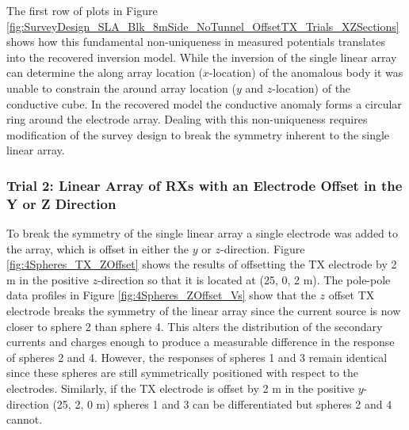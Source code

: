 \documentclass[preprint,authoryear,12pt]{elsarticle}
\begin{document}
The first row of plots in Figure \ref{fig:SurveyDesign_SLA_Blk_8mSide_NoTunnel_OffsetTX_Trials_XZSections} shows how this fundamental non-uniqueness in measured potentials translates into the recovered inversion model. While the inversion of the single linear array can determine the along array location ($x$-location) of the anomalous body it was unable to constrain the around array location ($y$ and $z$-location) of the conductive cube. In the recovered model the conductive anomaly forms a circular ring around the electrode array. Dealing with this non-uniqueness requires modification of the survey design to break the symmetry inherent to the single linear array.


\subsubsection{Trial 2: Linear Array of RXs with an Electrode Offset in the Y or Z Direction}
\label{sec:TheoreticalAnalysis_Trial2_SingleElecOffset}

To break the symmetry of the single linear array a single electrode was added to the array, which is offset in either the $y$ or $z$-direction. Figure \ref{fig:4Spheres_TX_ZOffset} shows the results of offsetting the TX electrode by 2 m in the positive $z$-direction so that it is located at (25, 0, 2 m). The pole-pole data profiles in Figure \ref{fig:4Spheres_ZOffset_Vs} show that the $z$ offset TX electrode breaks the symmetry of the linear array since the current source is now closer to sphere 2 than sphere 4. This alters the distribution of the secondary currents and charges enough to produce a measurable difference in the response of spheres 2 and 4. However, the responses of spheres 1 and 3 remain identical since these spheres are still symmetrically positioned with respect to the electrodes. Similarly, if the TX electrode is offset by 2 m in the positive $y$-direction (25, 2, 0 m) spheres 1 and 3 can be differentiated but spheres 2 and 4 cannot.
\end{document}
